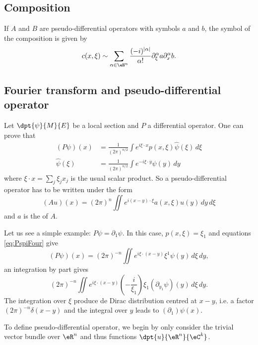 \subsection{Composition}

If $A$ and $B$ are pseudo-differential operators with symbols $a$ and $b$, the symbol of the composition is given by
\begin{equation}		\label{EqCompPSDSymb}
c(x,\xi)\sim \sum_{\alpha\in\eN^n} \frac{ (-i)^{| \alpha |} }{ \alpha! }\partial_{\xi}^{\alpha}a\partial_x^{\alpha}b.
\end{equation}


\subsection{Fourier transform and pseudo-differential operator} 

Let $\dpt{ \psi }{ M }{ E }$ be a local section and $P$ a differential operator. One can prove that
\begin{subequations} \label{eq:PspiFour}
\begin{align}
  (P\psi)(x)&=\frac{1}{ (2\pi)^{n/2} } \int e^{i\xi\cdot x}p(x,\xi)\hat\psi(\xi)\,d\xi\\
  \hat\psi(\xi)&= \frac{1}{ (2\pi)^{n/2} }\int e^{-i\xi\cdot y}\psi(y)\,dy 
\end{align}
\end{subequations}
where $\xi\cdot x=\sum_j\xi_jx_j$ is the usual scalar product. So a pseudo-differential operator has to be written under the form
\begin{equation}
  (Au)(x)=(2\pi)^n\iint e^{i(x-y)\cdot \xi}a(x,\xi)u(y)\,dy\,d\xi
\end{equation}
and $a$ is the  of $A$.


Let us see a simple example: $P\psi=\partial_1\psi$. In this case, $p(x,\xi)=\xi_1$ and equations \eqref{eq:PspiFour} give
\[ 
  (P\psi)(x)=(2\pi)^{-n}\iint e^{i\xi\cdot(x-y)}\xi^1\psi(y)\,d\xi\,dy,
\]
 an integration by part gives
\[ 
  (2\pi)^{-n}\iint e^{i\xi\cdot(x-y)}(-\frac{ i }{ \xi_1 })\xi_1(\partial_{y_1}\psi)(y)\,d\xi\,dy.
\]
The integration over $\xi$ produce de Dirac distribution centred at $x-y$, i.e. a factor $(2\pi)^{-n}\delta(x-y)$ and the integral over $y$ leads to $(\partial_1)\psi(x)$.

To define pseudo-differential operator, we begin by only consider the trivial vector bundle over $\eR^n$ and thus functions $\dpt{ u }{ \eR^n }{ \eC^k }$.

